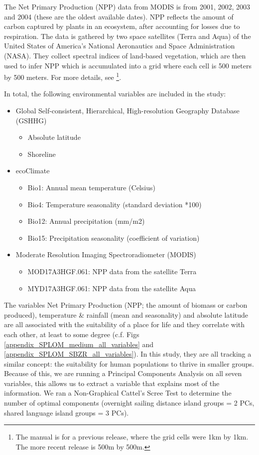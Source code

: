 \documentclass[12pt,letterpaper]{article}
\begin{document}
The Net Primary Production (NPP) data from MODIS is from 2001, 2002, 2003 and 2004 (these are the oldest available dates). NPP reflects the amount of carbon captured by plants in an ecosystem, after accounting for losses due to respiration. The data is gathered by two space satellites (Terra and Aqua) of the United States of America's National Aeronautics and Space Administration (NASA). They collect spectral indices of land-based vegetation, which are then used to infer NPP which is accumulated into a grid where each cell is 500 meters by 500 meters. For more details, see \citet{running2015daily} \footnote{The manual is for a previous release, where the grid cells were 1km by 1km. The more recent release is 500m by 500m.}.

In total, the following environmental variables are included in the study:

\begin{itemize}
\item Global Self-consistent, Hierarchical, High-resolution Geography Database (GSHHG)
\begin{itemize}
    \item Absolute latitude
    \item Shoreline
\end{itemize}
\item ecoClimate
\begin{itemize}
\item Bio1: Annual mean temperature (Celsius)
\item Bio4: Temperature seasonality (standard deviation *100)
\item Bio12: Annual precipitation (mm/m2)
\item Bio15: Precipitation seasonality (coefficient of variation)
\end{itemize}
\item Moderate Resolution Imaging Spectroradiometer (MODIS)
\begin{itemize}
    \item MOD17A3HGF.061: NPP data from the satellite Terra
    \item MYD17A3HGF.061: NPP data from the satellite Aqua
\end{itemize}
\end{itemize}

The variables Net Primary Production (NPP; the amount of biomass or carbon produced), temperature \& rainfall (mean and seasonality) and absolute latitude are all associated with the suitability of a place for life and they correlate with each other, at least to some degree (c.f. Figs \ref{appendix_SPLOM_medium_all_variables} and \ref{appendix_SPLOM_SBZR_all_variables}). In this study, they are all tracking a similar concept: the suitability for human populations to thrive in smaller groups. Because of this, we are running a Principal Components Analysis on all seven variables, this allows us to extract a variable that explains most of the information. We ran a Non-Graphical Cattel's Scree Test \citep{cattell1966scree, R-nFactors} to determine the number of optimal components (overnight sailing distance island groups = 2 PCs, shared language island groups = 3 PCs).
\FloatBarrier
\end{document}
